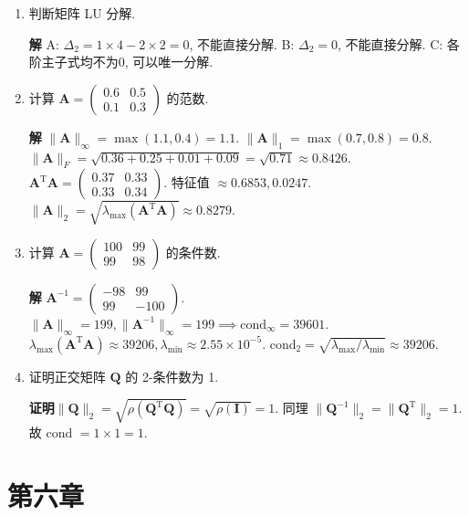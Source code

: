 \documentclass[a4paper,11pt]{ctexart}
\newcommand{\sol}{\par\noindent\textbf{解}\quad}
\newcommand{\proof}{\par\noindent\textbf{证明}\quad}
\newcommand{\T}{\mathrm{T}}        %
\begin{document}
\begin{enumerate}[label=\textbf{5-\arabic*.}, leftmargin=*]
    \item[11.] 判断矩阵 LU 分解.
    \sol
    A: $\Delta_2 = 1\times 4 - 2\times 2 = 0$, 不能直接分解.
    B: $\Delta_2 = 0$, 不能直接分解.
    C: 各阶主子式均不为0, 可以唯一分解.

    \item[12.] 计算 $\bm{A} = \begin{pmatrix} 0.6 & 0.5 \\ 0.1 & 0.3 \end{pmatrix}$ 的范数.
    
    \sol
    $\|\bm{A}\|_\infty = \max(1.1, 0.4) = 1.1$.
    $\|\bm{A}\|_1 = \max(0.7, 0.8) = 0.8$.
    $\|\bm{A}\|_F = \sqrt{0.36+0.25+0.01+0.09} = \sqrt{0.71} \approx 0.8426$.
    $\bm{A}^\T \bm{A} = \begin{pmatrix} 0.37 & 0.33 \\ 0.33 & 0.34 \end{pmatrix}$. 特征值 $\approx 0.6853, 0.0247$.
    $\|\bm{A}\|_2 = \sqrt{\lambda_{\max}(\bm{A}^\T \bm{A})} \approx 0.8279$.

    \item[18.] 计算 $\bm{A} = \begin{pmatrix} 100 & 99 \\ 99 & 98 \end{pmatrix}$ 的条件数.
    \sol
    $\bm{A}^{-1} = \begin{pmatrix} -98 & 99 \\ 99 & -100 \end{pmatrix}$.
    $\|\bm{A}\|_\infty = 199, \|\bm{A}^{-1}\|_\infty = 199 \implies \text{cond}_\infty = 39601$.
    $\lambda_{\max}(\bm{A}^\T\bm{A}) \approx 39206, \lambda_{\min} \approx 2.55\times 10^{-5}$.
    $\text{cond}_2 = \sqrt{\lambda_{\max}/\lambda_{\min}} \approx 39206$.

    \item[19.] 证明正交矩阵 $\bm{Q}$ 的 2-条件数为 1.
    \proof $\|\bm{Q}\|_2 = \sqrt{\rho(\bm{Q}^\T\bm{Q})} = \sqrt{\rho(\bm{I})} = 1$.
    同理 $\|\bm{Q}^{-1}\|_2 = \|\bm{Q}^\T\|_2 = 1$.
    故 cond $= 1 \times 1 = 1$.
\end{enumerate}
\section*{第六章}
\end{document}
